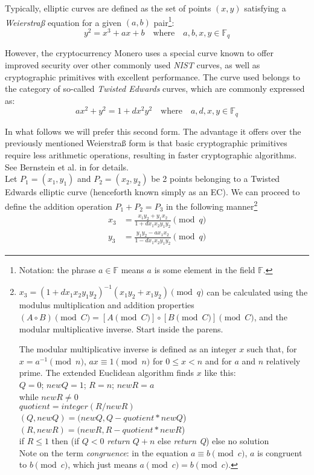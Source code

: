 Typically, elliptic curves are defined as the set of points \((x, y)\) satisfying a {\em Weierstraß} equation for a given $(a,b)$ pair\footnote{\label{notation1}Notation: the phrase $a \in \mathbb{F}$ means $a$ is some element in the field $\mathbb{F}$.}:
\[y^2 = x^3 + a x + b \quad \textrm{where} \quad a, b, x, y \in \mathbb{F}_q \]

However, the cryptocurrency Monero uses a special curve known to offer improved security over other commonly used {\em NIST} curves, as well as cryptographic primitives with excellent performance. The curve used belongs to the category of so-called {\em Twisted Edwards} curves, which are commonly expressed as: 
\[a x^2 + y^2 = 1 + d x^2 y^2 \quad \textrm{where} \quad a, d, x, y \in \mathbb{F}_q \]


In what follows we will prefer this second form. The advantage it offers over the previously mentioned Weierstraß form is that basic cryptographic primitives require less arithmetic operations, resulting in faster cryptographic algorithms. See Bernstein et al. in  \cite{Bernstein2007} for details.
\\

Let \(P_1 = (x_1, y_1)\) and \(P_2 = (x_2, y_2)\) be 2 points belonging to a Twisted Edwards elliptic curve (henceforth known simply as an EC). We can proceed to define the addition operation $P_1 + P_2 = P_3$ in the following manner\footnote{\label{modulus_math_note}$x_3 = (1+d x_1 x_2 y_1 y_2)^{-1} (x_1 y_2+x_1 y_2) \pmod{q}$ can be calculated using the modulus multiplication and addition properties $(A \circ B) \pmod{C} = {[A \pmod {C}] \circ [B \pmod{C}]} \pmod{C}$, and the modular multiplicative inverse. Start inside the parens.

The modular multiplicative inverse is defined as an integer $x$ such that, for $x = a^{-1} \pmod{n}$, $a x \equiv 1 \pmod{n}$ for $0 \leq x < n$ and for $a$ and $n$ relatively prime. The extended Euclidean algorithm finds $x$ like this:
\\ \newline
$Q = 0$; $newQ =1$; $R=n$; $newR =a$ \\
while $newR \ne 0$\\
\indent $quotient = integer(R/newR)$\\
\indent $(Q, newQ) = (newQ, Q - quotient*newQ$)\\
\indent $(R, newR) = (newR, R - quotient*newR$)\\
if $R \leq 1$ then (if $Q < 0$ {\em return $Q + n$} else {\em return Q}) else no solution
\\ \newline
Note on the term {\em congruence}: in the equation $a \equiv b \pmod{c}$, $a$ is congruent to $b \pmod{c}$, which just means $a \pmod{c} = b \pmod{c}$.}\\
\begin{align*}
x_3 & =  \frac{x_1 y_2 + y_1 x_ 2}{1 + d x_1 x_2 y_1 y_2}  \pmod{q} \\
y_3 & =  \frac{y_1 y_2 - a x_1 x_2}{1 - d x_1 x_2 y_1 y_2} \pmod{q} 
\end{align*}

